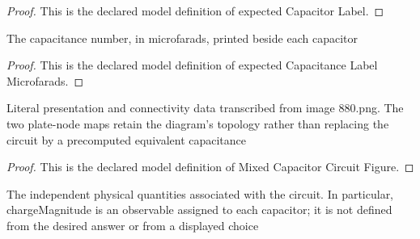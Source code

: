 \begin{proof}
  This is the declared model definition of expected Capacitor Label.
\end{proof}
\begin{definition}
  \label{def:physics:phyx-mini-0880:phyxminiproblems-problemphyxmini0880-expectedcapacitancelabelmicrofarads}
  The capacitance number, in microfarads, printed beside each capacitor
\end{definition}
\begin{proof}
  This is the declared model definition of expected Capacitance Label Microfarads.
\end{proof}
\begin{definition}
  \label{def:physics:phyx-mini-0880:phyxminiproblems-problemphyxmini0880-mixedcapacitorcircuitfigure}
  Literal presentation and connectivity data transcribed from image 880.png. The two plate-node maps retain the diagram's topology rather than replacing the circuit by a precomputed equivalent capacitance
\end{definition}
\begin{proof}
  This is the declared model definition of Mixed Capacitor Circuit Figure.
\end{proof}
\begin{definition}
  \label{def:physics:phyx-mini-0880:phyxminiproblems-problemphyxmini0880-mixedcapacitorcircuitsetup}
  The independent physical quantities associated with the circuit. In particular, chargeMagnitude is an observable assigned to each capacitor; it is not defined from the desired answer or from a displayed choice
\end{definition}
